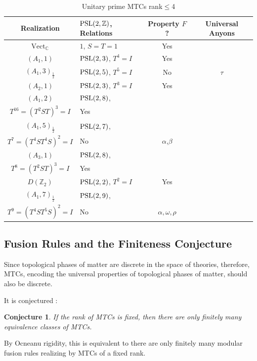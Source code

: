 \documentclass[12pt,psamsfonts]{amsart}
\DeclareMathOperator{\Vect}{Vect}
\newcommand{\C}{\mathbb C}
\newcommand{\Z}{\mathbb Z}
\numberwithin{equation}{section}
\newtheorem{conj}[theorem]{Conjecture}
\theoremstyle{definition}
\begin{document}
\begin{table}\caption{Unitary prime MTCs rank$\leq$4}\label{rank4}
\begin{tabular}{|c|p{4cm}|c|c|}
\hline
Realization & $\PSL(2,\Z)$, Relations & Property $F$?& Universal Anyons\\
\hline\hline
$\Vect_\C$ & $1$, $S=T=1$ &Yes& \\
\hline
 $(A_1,1)$ &\raggedright $\operatorname{PSL}(2,3)$, $T^4=I$ &Yes &\\
\hline $(A_1,3)_{\frac{1}{2}}$ & $\operatorname{PSL}(2,5)$, $T^5=I$ &No & $\tau$\\
\hline $(A_2,1)$ & $\operatorname{PSL}(2,3)$, $T^3=I$ &Yes &\\
\hline $(A_1,2)$ &\raggedright $\operatorname{PSL}(2,8)$, \\$T^{16}=(T^2S T)^3=I$ &Yes &\\
\hline $(A_1,5)_{\frac{1}{2}}$ &\raggedright $\operatorname{PSL}(2,7)$,\\ $T^7=(T^4S T^4S)^2=I$ &No & $\alpha$,$\beta$\\
\hline $(A_3,1)$ &\raggedright $\operatorname{PSL}(2,8)$, \\$T^8=(T^2S T)^3=I$ &Yes &\\
\hline $D(\Z_2)$ & $\operatorname{PSL}(2,2)$, $T^2=I$ &Yes &\\
\hline $(A_1,7)_{\frac{1}{2}}$ &\raggedright $\operatorname{PSL}(2,9)$, \\$T^9=(T^4S T^5S)^2=I$ &No &$\alpha,\omega,\rho$\\
\hline
\end{tabular}
\end{table}\fi


\subsection{Fusion Rules and the Finiteness Conjecture}

Since topological phases of matter are discrete in
the space of theories, therefore, MTCs,  encoding the universal properties of
topological phases of matter, should also be discrete.

\iffalse This idea is evidenced by Ocneanu rigidity of fusion categories.
Ocneanu rigidity was found when M.~ Freedman asked operator
algebraists about a similar rigidity about the Jones-Wenzl
projectors \cite{Freedman2}.  A proof of the Ocneanu rigidity was
described in a talk at MSRI by A.~ Wasserman for unitary fusion
categories. A proof with generalizations was published in
\cite{ENO}. Ocneanu rigidity says that if a set of fusion rules is
fixed, then there are only finitely many equivalence classes of
fusion categories realizing this set of fusion rules. An extension
shows that there are also only finitely many possible compatible
braidings. \fi
 It is conjectured \cite{Wang}:
\begin{conj}
 If the rank of MTCs is fixed, then there are
only finitely many equivalence classes of MTCs.
\end{conj}
 By Ocneanu rigidity, this is equivalent
to there are only finitely many modular fusion rules realizing by
MTCs of a fixed rank.
\end{document}
